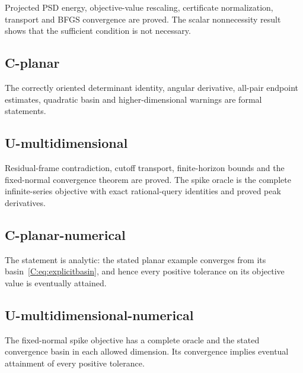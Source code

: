 Projected PSD energy, objective-value rescaling, certificate normalization, transport and BFGS convergence are proved. The scalar nonnecessity result shows that the sufficient condition is not necessary.



\subsection{C-planar}\label{c-planar}

The correctly oriented determinant identity, angular derivative, all-pair endpoint estimates, quadratic basin and higher-dimensional warnings are formal statements.



\subsection{U-multidimensional}\label{u-multidimensional}

Residual-frame contradiction, cutoff transport, finite-horizon bounds and the fixed-normal convergence theorem are proved. The spike oracle is the complete infinite-series objective with exact rational-query identities and proved peak derivatives.



\subsection{C-planar-numerical}\label{c-planar-numerical}

The statement is analytic: the stated planar example converges from its basin~\eqref{C:eq:explicitbasin}, and hence every positive tolerance on its objective value is eventually attained.



\subsection{U-multidimensional-numerical}\label{u-multidimensional-numerical}

The fixed-normal spike objective has a complete oracle and the stated convergence basin in each allowed dimension. Its convergence implies eventual attainment of every positive tolerance.




